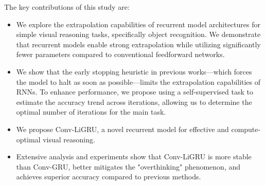 The key contributions of this study are:
\begin{itemize}
    \item We explore the extrapolation capabilities of recurrent model architectures for simple visual reasoning tasks, specifically object recognition. 
    We demonstrate that recurrent models enable strong extrapolation while utilizing significantly fewer parameters compared to conventional feedforward networks.
    \item We show that the early stopping heuristic in previous works—which forces the model to halt as soon as possible—limits the extrapolation capabilities of RNNs. 
    To enhance performance, we propose using a self-supervised task to estimate the accuracy trend across iterations, allowing us to determine the optimal number of iterations for the main task.
    \item We propose Conv-LiGRU, a novel recurrent model for effective and compute-optimal visual reasoning. 
    \item Extensive analysis and experiments show that Conv-LiGRU is more stable than Conv-GRU, better mitigates the "overthinking" phenomenon, and achieves superior accuracy compared to previous methods.

\end{itemize}
